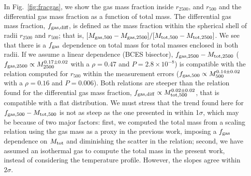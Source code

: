 \documentclass{aa}
\begin{document}
In Fig.~\ref{fig:fracgas}, we show the gas mass fraction inside
$r_{2500}$, and $r_{500}$ and the differential gas mass
fraction as a function of total mass.  The differential gas mass
fraction, $f_{\rm gas, diff}$, is defined as the mass fraction within the spherical shell of radii $r_{2500}$ and 
$r_{500}$; that is, $[M_{\rm gas,500} - M_{\rm gas,2500}] / [M_{\rm tot,500} - M_{\rm tot,2500}]$.
We see
that there is a  $f_{\rm gas}$ dependence on total mass for total
masses enclosed in both radii.  If we assume a linear
  dependence (BCES bisector), $f_{\rm gas,2500}-M_{\rm tot,2500}$ 
($f_{\rm gas, 2500} \propto M_{2500}^{0.17 \pm 0.02}$ with a $\rho=0.47$ and $P=2.8
\times 10^{-8}$) is compatible with the relation computed for $r_{500}$ within the measurement errors
 ($f_{\rm gas, 500} \propto M_{500}^{0.14 \pm 0.02}$ with a $\rho=0.16$ and $P=0.006$).  
 Both relations are steeper than the relation found for the differential gas mass fraction, 
$f_{\rm gas, diff} \propto M_{\rm tot,500}^{0.02 \pm 0.02}$, that is compatible with a flat distribution.
We must
stress that  the trend found here for $f_{\rm gas,500}-M_{\rm tot,500}$
is not as steep as the one presented in \citet{lagana11} within 1$\sigma$, which may be because
of two major factors: first,  we
computed the total mass from a scaling relation using the gas mass as
a proxy in the previous work, imposing a $f_{\rm gas}$ dependence on $M_{\rm tot}$ and
diminishing the scatter in the relation; second, we have assumed an isothermal gas to compute
the total mass  in the present work, instead of considering the temperature
profile. However, the slopes agree within $2\sigma$.
\end{document}
